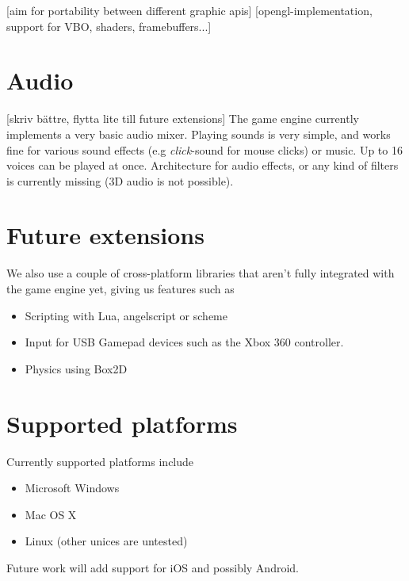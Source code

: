 [aim for portability between different graphic apis]
[opengl-implementation, support for VBO, shaders, framebuffers...]

\section{Audio}
[skriv bättre, flytta lite till future extensions]
The game engine currently implements a very basic audio mixer. Playing sounds is very simple, and works fine
for various sound effects (e.g \textit{click}-sound for mouse clicks) or music. Up to 16 voices can be played at once. Architecture for audio effects, or any kind of filters is currently missing (3D audio is not possible).

\section{Future extensions}

We also use a couple of cross-platform libraries that aren't fully integrated with the game engine yet, giving us features such as
\begin{itemize}
\item Scripting with Lua, angelscript or scheme
\item Input for USB Gamepad devices such as the Xbox 360 controller.
\item Physics using Box2D
\end{itemize}

\section{Supported platforms}
Currently supported platforms include
\begin{itemize}
\item Microsoft Windows
\item Mac OS X
\item Linux (other unices are untested)
\end{itemize}
Future work will add support for iOS and possibly Android.

